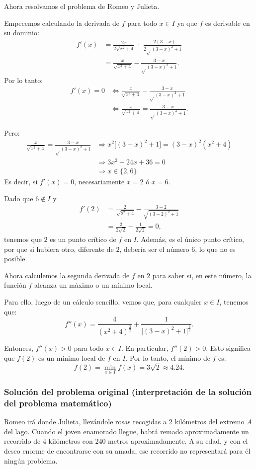 Ahora resolvamos el problema de Romeo y Julieta.

Empecemos calculando la derivada de $f$ para todo $x\in I$ ya que $f$ es derivable en su dominio:
\begin{align*}
f'(x) &= \frac{2x}{2\sqrt{x^2 + 4}} + \frac{-2(3 - x)}{2\sqrt{}(3 - x)^2 + 1} \\
      &= \frac{x}{\sqrt{x^2 + 4}} - \frac{3 - x}{\sqrt{}(3 - x)^2 + 1}.
\end{align*}
Por lo tanto:
\begin{align*}
f'(x) = 0 &\Leftrightarrow \frac{x}{\sqrt{x^2 + 4}} - \frac{3 - x}{\sqrt{}(3 - x)^2 + 1} \\
    &\Leftrightarrow \frac{x}{\sqrt{x^2 + 4}} = \frac{3 - x}{\sqrt{}(3 - x)^2 + 1}.
\end{align*}

Pero:
\begin{align*}
\frac{x}{\sqrt{x^2 + 4}} = \frac{3 - x}{\sqrt{}(3 - x)^2 + 1} &\Rightarrow
x^2\big[(3 - x)^2 + 1\big] = (3 - x)^2(x^2 + 4) \\
&\Rightarrow 3x^2 - 24x + 36 = 0 \\
&\Rightarrow x \in\{2,6\}.
\end{align*}
Es decir, si $f'(x) = 0$, necesariamente $x = 2$ ó $x = 6$.

Dado que $6\not\in I$ y
\begin{align*}
f'(2) &= \frac{2}{\sqrt{2^2 + 4}} - \frac{3 - 2}{\sqrt{(3 - 2)^2 + 1}} \\
    &= \frac{2}{2\sqrt{2}} - \frac{1}{2\sqrt{2}} = 0,
\end{align*}
tenemos que $2$ es un punto crítico de $f$ en $I$. Además, es el único punto crítico, por que si
hubiera otro, diferente de $2$, debería ser el número $6$, lo que no es posible.

Ahora calculemos la segunda derivada de $f$ en $2$ para saber si, en este número, la función $f$
alcanza un máximo o un mínimo local.

Para ello, luego de un cálculo sencillo, vemos que, para cualquier $x\in I$, tenemos que:
\[
f''(x) = \frac{4}{(x^2 + 4)^{\frac{3}{2}}} +
\frac{1}{\big[(3 - x)^2 + 1\big]^{\frac{3}{2}}}.
\]

Entonces, $f''(x) > 0$ para todo $x\in I$. En particular, $f''(2) > 0$.  Esto significa que $f(2)$
es un mínimo local de $f$ en $I$. Por lo tanto, el mínimo de $f$ es:
\[
f(2) = \min_{x\in I}f(x) = 3\sqrt{2} \approx 4.24.
\]

\subsubsection{Solución del problema original (interpretación de la solución del problema matemático)}
Romeo irá donde Julieta, llevándole rosas recogidas a $2$ kilómetros del extremo $A$ del lago.
Cuando el joven enamorado llegue, habrá remado aproximadamente un recorrido de $4$ kilómetros con
$240$ metros aproximadamente. A su edad, y con el deseo enorme de encontrarse con su amada, ese
recorrido no representará para él ningún problema.

